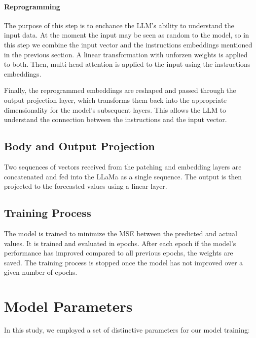 \paragraph{Reprogramming}
The purpose of this step is to enchance the LLM's ability to understand the input data. At the moment the input may be seen as random to the model, so in this step we combine the input vector and the instructions embeddings mentioned in the previous section. A linear transformation with unforzen weights is applied to both. Then, multi-head attention is applied to the input using the instructions embeddings.

Finally, the reprogrammed embeddings are reshaped and passed through the output projection layer, which transforms them back into the appropriate dimensionality for the model's subsequent layers. This allows the LLM to understand the connection between the instructions and the input vector.

\subsection{Body and Output Projection}
Two sequences of vectors received from the patching and embedding layers are concatenated and fed into the LLaMa as a single sequence. The output is then projected to the forecasted values using a linear layer.


\subsection{Training Process}

The model is trained to minimize the MSE between the predicted and actual values. It is trained and evaluated in epochs. After each epoch if the model's performance has improved compared to all previous epochs, the weights are saved. The training process is stopped once the model has not improved over a given number of epochs.

\section{Model Parameters}
In this study, we employed a set of distinctive parameters for our model training:

